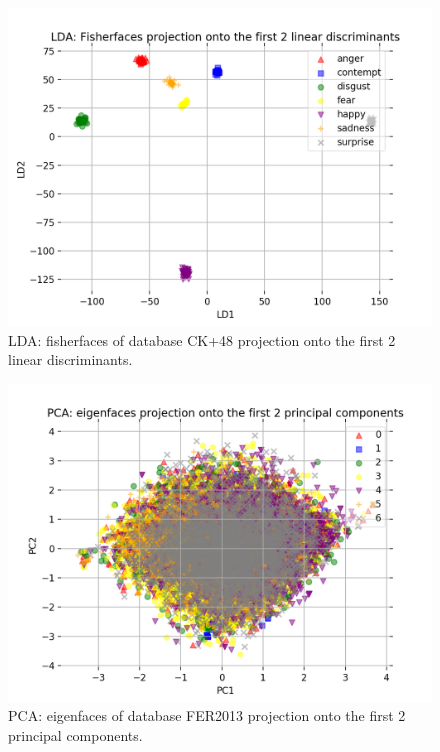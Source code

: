 \documentclass[10pt,twocolumn,letterpaper]{article}
\begin{document}
\begin{figure}[t]
\begin{center}
  \includegraphics[width=0.8\linewidth]{Feature Extraction Images/lda_projection.png}
  \caption{LDA: fisherfaces of database CK+48 projection onto the first 2 linear discriminants.}
  \label{fig:lda_projection}
\end{center}
\end{figure}

\begin{figure}[t]
\begin{center}
  \includegraphics[width=0.8\linewidth]{Feature Extraction Images/fer2013_pca_projection.png}
  \caption{PCA: eigenfaces of database FER2013 projection onto the first 2 principal components. \cite{Article06}}
  \label{fig:fer_pca_proj}
\end{center}
\end{figure}
\end{document}
